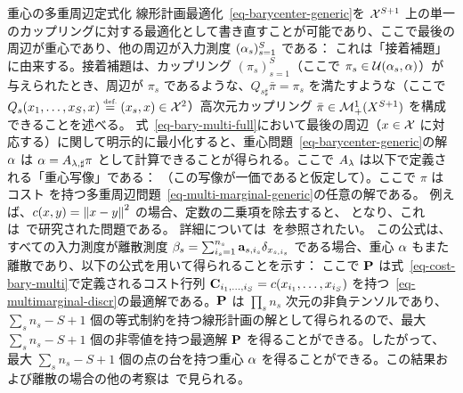 \begin{rem2}{重心の多重周辺定式化}\label{eq-multimarg-bary}
	線形計画最適化~\eqref{eq-barycenter-generic}を $\X^{S+1}$ 上の単一のカップリングに対する最適化として書き直すことが可能であり、ここで最後の周辺が重心であり、他の周辺が入力測度 $(\al_s)_{s=1}^S$ である：
	これは「接着補題」に由来する。接着補題は、カップリング $(\pi_s)_{s=1}^S$（ここで $\pi_s \in \Couplings(\al_s,\al)$）が与えられたとき、周辺が $\pi_s$ であるような、\ie $Q_{s\sharp}\bar\pi=\pi_s$ を満たすような（ここで $Q_s(x_1,\ldots,x_S,x) \eqdef (x_s,x) \in \X^2$）高次元カップリング $\bar \pi \in \Mm_+^1(X^{S+1})$ を構成できることを述べる。
	式~\eqref{eq-bary-multi-full}において最後の周辺（$x \in \X$ に対応する）に関して明示的に最小化すると、重心問題~\eqref{eq-barycenter-generic}の解 $\al$ は $\al = A_{\la,\sharp} \pi$ として計算できることが得られる。ここで $A_\la$ は以下で定義される「重心写像」である：
	（この写像が一価であると仮定して）。ここで $\pi$ はコスト
	を持つ多重周辺問題~\eqref{eq-multi-marginal-generic}の任意の解である。
	例えば、$c(x,y)=\norm{x-y}^2$ の場合、定数の二乗項を除去すると、
	となり、これは~\citet{GangboSciech}で研究された問題である。
	詳細については~\citet{Carlier_wasserstein_barycenter}を参照されたい。
	この公式は、すべての入力測度が離散測度 $\be_s = \sum_{i_s=1}^{n_s} \a_{s,i_s} \de_{x_{s,i_s}}$ である場合、重心 $\al$ もまた離散であり、以下の公式を用いて得られることを示す：
	ここで $\P$ は式~\eqref{eq-cost-bary-multi}で定義されるコスト行列 $\C_{i_1,\ldots,i_S} = c(x_{i_1},\ldots,x_{i_S})$ を持つ~\eqref{eq-multimarginal-discr}の最適解である。$\P$ は $\prod_s n_s$ 次元の非負テンソルであり、$\sum_s n_s-S+1$ 個の等式制約を持つ線形計画の解として得られるので、最大 $\sum_s n_s-S+1$ 個の非零値を持つ最適解 $\P$ を得ることができる。したがって、最大 $\sum_s n_s-S+1$ 個の点の台を持つ重心 $\al$ を得ることができる。この結果および離散の場合の他の考察は~\citet{anderes2016discrete}で見られる。
\end{rem2}

